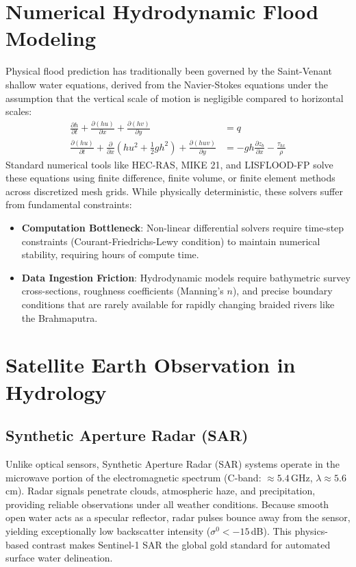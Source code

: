 \documentclass[12pt,a4paper,oneside]{report}
\begin{document}
\section{Numerical Hydrodynamic Flood Modeling}
Physical flood prediction has traditionally been governed by the Saint-Venant shallow water equations, derived from the Navier-Stokes equations under the assumption that the vertical scale of motion is negligible compared to horizontal scales:
\begin{align}
\frac{\partial h}{\partial t} + \frac{\partial (hu)}{\partial x} + \frac{\partial (hv)}{\partial y} &= q \\
\frac{\partial (hu)}{\partial t} + \frac{\partial}{\partial x}\left(hu^2 + \frac{1}{2}gh^2\right) + \frac{\partial (huv)}{\partial y} &= -gh\frac{\partial z_b}{\partial x} - \frac{\tau_{bx}}{\rho}
\end{align}
Standard numerical tools like HEC-RAS, MIKE 21, and LISFLOOD-FP solve these equations using finite difference, finite volume, or finite element methods across discretized mesh grids. While physically deterministic, these solvers suffer from fundamental constraints:
\begin{itemize}
    \item \textbf{Computation Bottleneck}: Non-linear differential solvers require time-step constraints (Courant-Friedrichs-Lewy condition) to maintain numerical stability, requiring hours of compute time.
    \item \textbf{Data Ingestion Friction}: Hydrodynamic models require bathymetric survey cross-sections, roughness coefficients (Manning's $n$), and precise boundary conditions that are rarely available for rapidly changing braided rivers like the Brahmaputra.
\end{itemize}

\section{Satellite Earth Observation in Hydrology}
\subsection{Synthetic Aperture Radar (SAR)}
Unlike optical sensors, Synthetic Aperture Radar (SAR) systems operate in the microwave portion of the electromagnetic spectrum (C-band: $\approx 5.4$\,GHz, $\lambda \approx 5.6$\,cm). Radar signals penetrate clouds, atmospheric haze, and precipitation, providing reliable observations under all weather conditions. Because smooth open water acts as a specular reflector, radar pulses bounce away from the sensor, yielding exceptionally low backscatter intensity ($\sigma^0 < -15$\,dB). This physics-based contrast makes Sentinel-1 SAR the global gold standard for automated surface water delineation.
\end{document}
